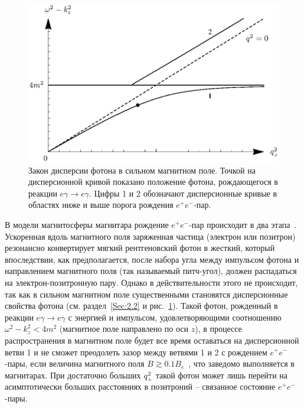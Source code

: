 %
\begin{figure}
\centerline{
\includegraphics[width=12cm]{fig5_3.eps}}
\caption{ Закон дисперсии фотона в сильном магнитном поле. 
Точкой на дисперсионной кривой 
показано положение фотона, рождающегося в реакции  $e \gamma \to e \gamma$.
 Цифры 1 и 2 обозначают дисперсионные кривые в областях ниже и выше 
порога рождения $e^+e^-$-пар.}
\label{fig:dispersion}
\end{figure}

В модели магнитосферы магнитара рождение $e^+e^-$-пар происходит в два 
этапа~\cite{Beloborodov:2007}. Ускоренная вдоль магнитного поля 
заряженная частица (электрон или позитрон)  
резонансно конвертирует мягкий рентгеновский 
фотон в жесткий, который впоследствии, как предполагается, 
после набора угла между импульсом фотона и направлением 
магнитного поля (так называемый питч-угол), 
должен распадаться на электрон-позитронную пару.  Однако в действительности этого не происходит, так как 
в сильном магнитном поле существенными становятся 
дисперсионные свойства фотона (см. раздел~\ref{Sec:2.2}  и рис.~\ref{fig:dispersion}). Такой фотон, рожденный 
в реакции $e\gamma \to e \gamma$ с энергией и импульсом, удовлетворяющими соотношению 
$\omega^2-k_z^2 < 4m^2$ (магнитное поле направлено по оси $z$), в процессе распространения 
в магнитном поле будет все время оставаться на дисперсионной ветви 1 и не сможет преодолеть 
зазор между ветвями 1 и 2 с рождением $e^+e^-$-пары, если 
величина магнитного поля $B \gtrsim 0.1 B_e$~\cite{Shabad:1975,ShabUsov:1982,ShabUsov:1985}, 
что заведомо выполняется в магнитарах. 
При достаточно больших $q^2_{\mbox{\tiny $\bot$}}$ 
такой фотон может лишь перейти на асимптотически больших расстояниях 
в позитроний -- связанное состояние $e^+e^-$-пары. 



